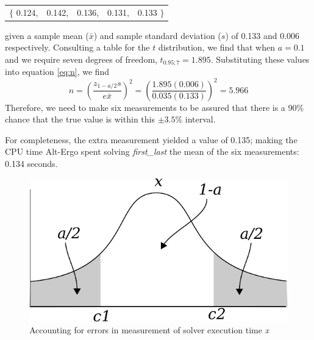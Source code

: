 \begin{tabularx}
	{\textwidth}{@{}YYYYY@{}}
	 $\lbrace$ 0.124, & 0.142, & 0.136, & 0.131, & 0.133 $\rbrace$
\end{tabularx} 

given a sample mean ($\bar{x}$) and sample standard deviation ($s$) of 0.133 and 0.006 respectively. 
Consulting a table for the $t$ distribution, we find that when $a=0.1$ and we require seven degrees of freedom, $t_{0.95;7} = 1.895$.
Substituting these values into equation \ref{eq:n}, we find
\begin{equation}
	n =  \left(\frac{z_{1-a/2}s}{e\bar{x}}\right)^2
	= \left(\frac{1.895(0.006)}{0.035(0.133)}\right)^2 = 5.966
\end{equation}    
Therefore, we need to make six measurements to be assured that there is a 90\% chance that the true value is within this $\pm3.5\%$ interval.

For completeness, the extra measurement yielded a value of 0.135; making the CPU time Alt-Ergo spent solving \textit{first\_last} the mean of the six measurements: 0.134 seconds.

\begin{figure}
\centering
\includegraphics[width=0.6\linewidth]{Figures/confidence}
\caption[Accounting for errors in measurement of solver execution time \textit{x}]{Accounting for errors in measurement of solver execution time \textit{x}}
\label{fig:confidence}
\end{figure}


